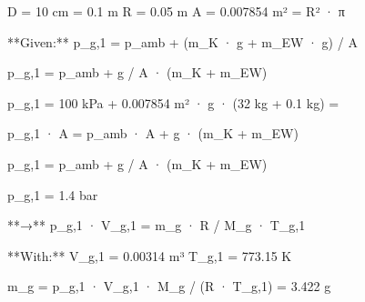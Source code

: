 D = 10 cm = 0.1 m  
R = 0.05 m  
A = 0.007854 m² = R² · π  

**Given:**  
p_g,1 = p_amb + (m_K · g + m_EW · g) / A  

p_g,1 = p_amb + g / A · (m_K + m_EW)  

p_g,1 = 100 kPa + 0.007854 m² · g · (32 kg + 0.1 kg) =  

p_g,1 · A = p_amb · A + g · (m_K + m_EW)  

p_g,1 = p_amb + g / A · (m_K + m_EW)  

p_g,1 = 1.4 bar  

**→** p_g,1 · V_g,1 = m_g · R / M_g · T_g,1  

**With:**  
V_g,1 = 0.00314 m³  
T_g,1 = 773.15 K  

m_g = p_g,1 · V_g,1 · M_g / (R · T_g,1) = 3.422 g